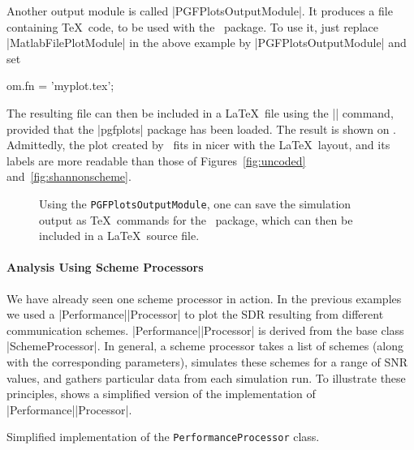 Another output module is called |PGFPlotsOutputModule|. It produces a file
containing \TeX\ code, to be used with the \pgfplots\ package. To use it, just
replace |MatlabFilePlotModule| in the above example by |PGFPlotsOutputModule|
and set \eg
\begin{Code}
  om.fn = 'myplot.tex';
\end{Code}
The resulting file can then be included in a \LaTeX\ file using the ||
command, provided that the |pgfplots| package has been loaded.  The result is
shown on . Admittedly, the plot created by \pgfplots\ fits in
nicer with the \LaTeX\ layout, and its labels are more readable than those of
Figures~\ref{fig:uncoded} and~\ref{fig:shannonscheme}.

\begin{figure}
  \begin{center}
    
  \end{center}
  \caption{Using the \texttt{PGFPlotsOutputModule}, one can save the simulation
  output as \TeX\ commands for the \pgfplots\ package, which can then be
  included in a \LaTeX\ source file.}
  \label{fig:uncodedpgf}
\end{figure}


\paragraph{Analysis Using Scheme Processors}

We have already seen one scheme processor in action. In the previous examples we
used a |Performance|\-|Processor| to plot the SDR resulting from different
communication schemes. |Performance|\-|Processor| is derived from the base class
|SchemeProcessor|. In general, a scheme processor takes a list of schemes (along
with the corresponding parameters), simulates these schemes for a range of SNR
values, and gathers particular data from each simulation run.  To illustrate
these principles,  shows a simplified version of the
implementation of |Performance|\-|Processor|. 

\begin{listing}
\caption{Simplified implementation of the \texttt{PerformanceProcessor} class.}
\label{lst:perfproc}
\end{listing}

